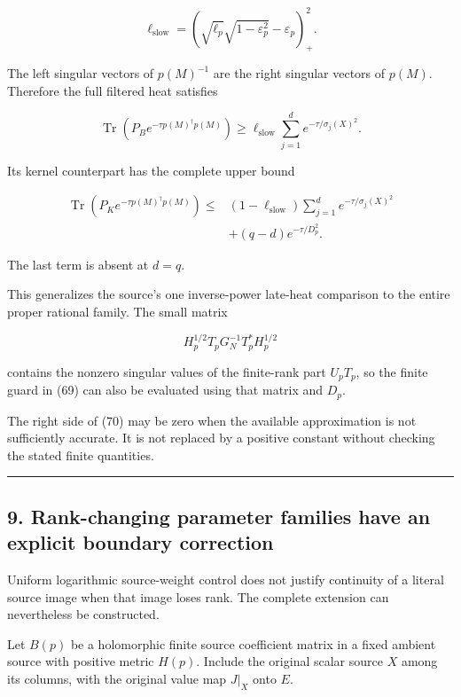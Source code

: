 \documentclass[11pt]{article}
\begin{document}
\[
\boxed{
\ell_{\mathrm{slow}}
=
\left(
\sqrt{\ell_p}\sqrt{1-\varepsilon_p^2}
-\varepsilon_p
\right)_+^2.
}
\tag{70}
\]

The left singular vectors of \(p(M)^{-1}\) are the right singular vectors of \(p(M)\). Therefore the full filtered heat satisfies

\[
\boxed{
\operatorname{Tr}\!\left(
P_Be^{-\tau p(M)^\dagger p(M)}
\right)
\ge
\ell_{\mathrm{slow}}
\sum_{j=1}^{d}e^{-\tau/\sigma_j(X)^2}.
}
\tag{71}
\]

Its kernel counterpart has the complete upper bound

\[
\boxed{
\begin{aligned}
\operatorname{Tr}\!\left(
P_Ke^{-\tau p(M)^\dagger p(M)}
\right)
\le{}&
(1-\ell_{\mathrm{slow}})
\sum_{j=1}^{d}e^{-\tau/\sigma_j(X)^2}\\
&+(q-d)e^{-\tau/D_p^2}.
\end{aligned}}
\tag{72}
\]

The last term is absent at \(d=q\).

This generalizes the source's one inverse-power late-heat comparison to the entire proper rational family. The small matrix

\[
H_p^{1/2}T_pG_N^{-1}T_p^*H_p^{1/2}
\]

contains the nonzero singular values of the finite-rank part \(U_pT_p\), so the finite guard in (69) can also be evaluated using that matrix and \(D_p\).

The right side of (70) may be zero when the available approximation is not sufficiently accurate. It is not replaced by a positive constant without checking the stated finite quantities.

\begin{center}\rule{0.5\linewidth}{0.5pt}\end{center}

\subsection{9. Rank-changing parameter families have an explicit boundary correction}\label{rank-changing-parameter-families-have-an-explicit-boundary-correction}

Uniform logarithmic source-weight control does not justify continuity of a literal source image when that image loses rank. The complete extension can nevertheless be constructed.

Let \(B(p)\) be a holomorphic finite source coefficient matrix in a fixed ambient source with positive metric \(H(p)\). Include the original scalar source \(X\) among its columns, with the original value map \(J|_X\) onto \(E\).
\end{document}
